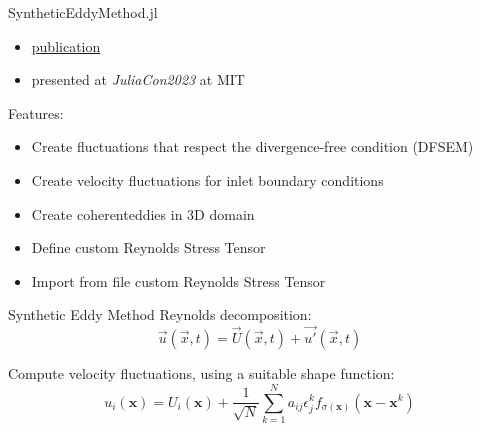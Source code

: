 \begin{frame}{SyntheticEddyMethod.jl}
\begin{itemize}
\item \href{https://www.theoj.org/joss-papers/joss.05565/10.21105.joss.05565.pdf}{publication}
\item presented at \textit{JuliaCon2023} at MIT
\end{itemize}

Features:
\begin{itemize}
\item Create fluctuations that respect the divergence-free condition (DFSEM)
\item Create velocity fluctuations for inlet boundary conditions
\item Create coherenteddies in 3D domain
\item Define custom Reynolds Stress Tensor
\item Import from file custom Reynolds Stress Tensor
\end{itemize}
\end{frame}


\begin{frame}{Synthetic Eddy Method}
Reynolds decomposition:
\begin{equation}
    \Vec{u}(\Vec{x},t) = \Vec{U}(\Vec{x},t) +  \Vec{u'}(\Vec{x},t)
    \label{sem:u}
\end{equation}

Compute velocity fluctuations, using a suitable shape function:
\begin{equation}
u_i(\boldsymbol{x})=U_i(\boldsymbol{x})+\frac{1}{\sqrt{N}} \sum_{k=1}^N a_{i j} \epsilon_j^k f_{\sigma(\boldsymbol{x})}\left(\boldsymbol{x}-\boldsymbol{x}^k\right)
\label{sem:ui}
\end{equation}
\end{frame}